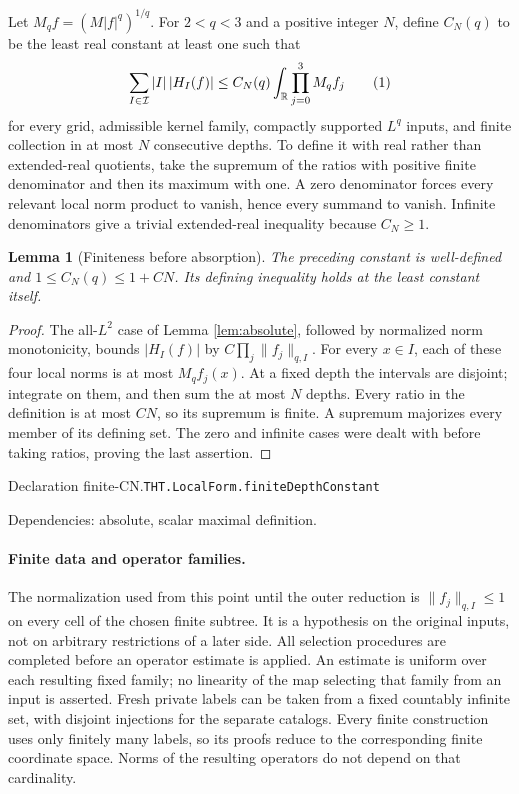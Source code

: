 \documentclass[11pt]{article}
\newtheorem{lemma}[theorem]{Lemma}
\theoremstyle{definition}
\newcommand{\R}{\mathbb R}
\newcommand{\eqtag}[1]{\refstepcounter{equation}\tag{\theequation}\label{#1}}
\numberwithin{equation}{section}
\newcommand{\bp}[3]{\par\smallskip\begingroup\footnotesize
\noindent\hypertarget{bp:#1}{\textsf{Declaration #1.}}\quad\nolinkurl{#2}\par
\noindent\textsf{Dependencies:} #3.\par\endgroup\smallskip}
\begin{document}
Let $M_qf=(M|f|^q)^{1/q}$. For $2<q<3$ and a positive integer $N$, define $C_N(q)$ to be the least real constant at least one such that
\[
 \sum_{I\in\mathcal I}|I|\,|H_I(f)|\le C_N(q)\int_\R\prod_{j=0}^3M_qf_j
 \eqtag{eq:CN}
\]
for every grid, admissible kernel family, compactly supported $L^q$ inputs, and finite collection in at most $N$ consecutive depths. To define it with real rather than extended-real quotients, take the supremum of the ratios with positive finite denominator and then its maximum with one. A zero denominator forces every relevant local norm product to vanish, hence every summand to vanish. Infinite denominators give a trivial extended-real inequality because $C_N\ge1$.

\begin{lemma}[Finiteness before absorption]\label{lem:finite-CN}
The preceding constant is well-defined and $1\le C_N(q)\le1+CN$. Its defining inequality holds at the least constant itself.
\end{lemma}
\begin{proof}
The all-$L^2$ case of Lemma \ref{lem:absolute}, followed by normalized norm monotonicity, bounds $|H_I(f)|$ by $C\prod_j\|f_j\|_{q,I}$. For every $x\in I$, each of these four local norms is at most $M_qf_j(x)$. At a fixed depth the intervals are disjoint; integrate on them, and then sum the at most $N$ depths. Every ratio in the definition is at most $CN$, so its supremum is finite. A supremum majorizes every member of its defining set. The zero and infinite cases were dealt with before taking ratios, proving the last assertion.
\end{proof}
\bp{finite-CN}{THT.LocalForm.finiteDepthConstant}{absolute, scalar maximal definition}

\paragraph{Finite data and operator families.}
The normalization used from this point until the outer reduction is $\|f_j\|_{q,I}\le1$ on every cell of the chosen finite subtree. It is a hypothesis on the original inputs, not on arbitrary restrictions of a later side. All selection procedures are completed before an operator estimate is applied. An estimate is uniform over each resulting fixed family; no linearity of the map selecting that family from an input is asserted. Fresh private labels can be taken from a fixed countably infinite set, with disjoint injections for the separate catalogs. Every finite construction uses only finitely many labels, so its proofs reduce to the corresponding finite coordinate space. Norms of the resulting operators do not depend on that cardinality.
\end{document}
